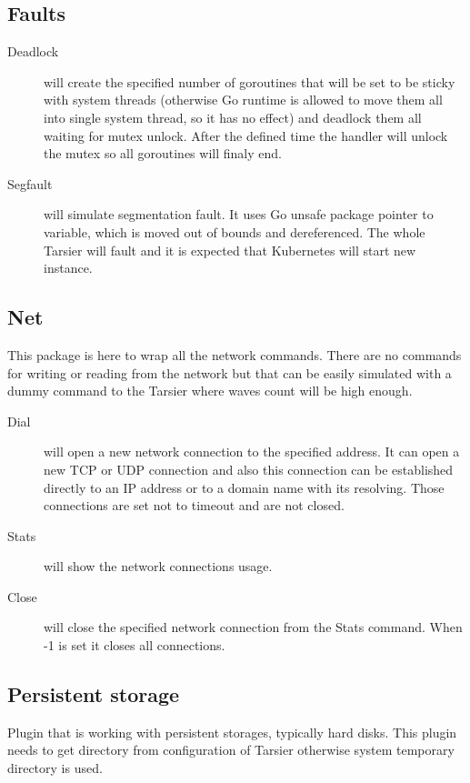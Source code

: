 \subsection{Faults}
\begin{description}
  \item[Deadlock] will create the specified number of goroutines that will be set to be sticky with system threads (otherwise Go runtime is allowed to move them all into single system thread, so it has no effect) and deadlock them all waiting for mutex unlock. After the defined time the handler will unlock the mutex so all goroutines will finaly end.
  \item[Segfault] will simulate segmentation fault. It uses Go unsafe package pointer to variable, which is moved out of bounds and dereferenced. The whole Tarsier will fault and it is expected that Kubernetes will start new instance.
\end{description}

\subsection{Net}
This package is here to wrap all the network commands. There are no commands for writing or reading from the network but that can be easily simulated with a dummy command to the Tarsier where waves count will be high enough.

\begin{description}
  \item[Dial] will open a new network connection to the specified address. It can open a new TCP or UDP connection and also this connection can be established directly to an IP address or to a domain name with its resolving. Those connections are set not to timeout and are not closed.
  \item[Stats] will show the network connections usage.
  \item[Close] will close the specified network connection from the Stats command. When -1 is set it closes all connections.
\end{description}

\subsection{Persistent storage}
Plugin that is working with persistent storages, typically hard disks. This plugin needs to get directory from configuration of Tarsier otherwise system temporary directory is used.


